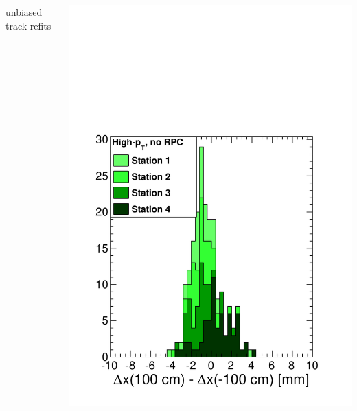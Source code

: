 \documentclass[compress]{beamer}
\begin{document}
\begin{frame}
\begin{columns}
\begin{center}
unbiased track refits \\ \mbox{ }
\end{center}
\includegraphics[width=\linewidth]{sawtooth_high_norpc.pdf}


\end{columns}
\end{frame}
\end{document}
